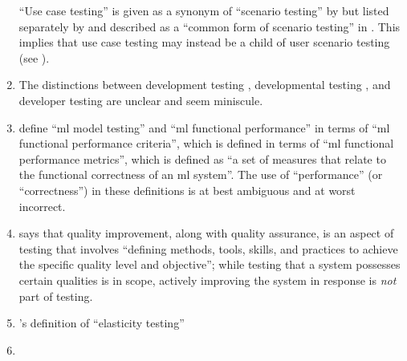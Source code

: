 \begin{enumerate}
          ``Use case testing'' is given as a synonym of ``scenario testing''
          by \citetISTQB{}
          but listed separately by
          \citet[Fig.~2]{IEEE2022} and described as a ``common form of scenario
          testing'' in \citeyearpar[p.~20]{IEEE2021c}.
          This implies that use case testing may instead be a child of
          user scenario testing (see ).
    \item %
          The distinctions between development testing \citep[p.~136]{IEEE2017},
          developmental testing \citep[p.~30]{Firesmith2015}, and developer
          testing \citep[p.~39;][p.~11]{Gerrard2000a} are unclear and seem
          miniscule.
    \item %
          \citetISTQB{} define
          ``\acf{ml} model testing'' and ``\acs{ml} functional performance''
          in terms of ``\acs{ml} functional performance criteria'',
          which is defined in terms of ``\acs{ml} functional performance
          metrics'', which is defined as ``a set of measures that relate to the
          functional correctness of an \acs{ml} system''. The use
          of ``performance'' (or ``correctness'') in these definitions is at
          best ambiguous and at worst incorrect.
    \item %
          \citet[p.~5\=/4]{SWEBOK2024} says that quality improvement,
          along with quality assurance, is an aspect of testing that involves
          ``defining methods, tools, skills, and practices to achieve the
          specific quality level and objective''; while testing that a system
          possesses certain qualities is in scope, actively improving the
          system in response is \emph{not} part of testing.
    \item %
          \citet[p.~5\=/9]{SWEBOK2024}'s definition of
          ``elasticity testing'' \swebokElasRef{}
    \item %

\end{enumerate}
